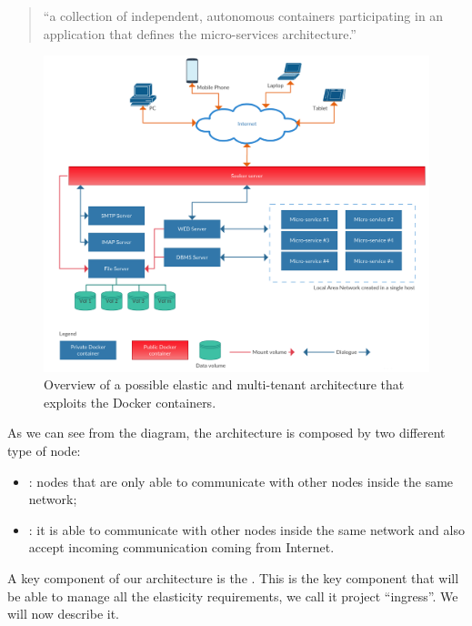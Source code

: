 \begin{center}
	\begin{quote}
		``a collection of independent, autonomous containers participating in an application that defines
		the micro-services architecture.''
	\end{quote}
\end{center}

\begin{figure}
	\centering{}
	\includegraphics[width=1.2\textwidth, angle=90]{chapters/architecture/images/architecture.png}
	\caption[Proposed architecture]{Overview of a possible elastic and multi-tenant architecture that
		exploits the Docker containers.}
	\label{img:architecture-proposal-architecture}
\end{figure}

As we can see from the diagram, the architecture is composed by two different type of node:

\begin{itemize}
	\item{: nodes that are only able to communicate with other nodes inside
		the same network;}
	\item{: it is able to communicate with other nodes inside the same network
		and also accept incoming communication coming from Internet.}
\end{itemize}

A key component of our architecture is the . This is the key component that will
be able to manage all the elasticity requirements, we call it project ``ingress''. We will now describe
it.

